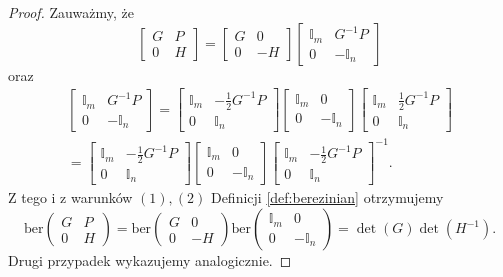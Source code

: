 \documentclass[11pt,a4paper]{report}
\theoremstyle{definition}
\newcommand{\ber}{\mathrm{ber}}
\begin{document}
\begin{proof}
	Zauważmy, że $$\begin{bmatrix}
	G & P \\
	0 & H
	\end{bmatrix} 
	= 
	\begin{bmatrix}
		G & 0  \\
		0 & -H 
	\end{bmatrix} \begin{bmatrix}
	\mathbb{I}_m & G^{-1}P \\
	0 & - \mathbb{I}_n
	\end{bmatrix}$$ oraz
	\begin{equation*}
		\begin{aligned}
			\begin{bmatrix}
			\mathbb{I}_m & G^{-1}P              \\
			0            & - \mathbb{I}_n       
			\end{bmatrix} 
			= 
			\begin{bmatrix}
			\mathbb{I}_m & -\frac{1}{2}G^{-1}P  \\
			0            & \mathbb{I}_n         
			\end{bmatrix} \begin{bmatrix}
			\mathbb{I}_m & 0                    \\
			0            & - \mathbb{I}_n       
			\end{bmatrix} \begin{bmatrix}
			\mathbb{I}_m & \frac{1}{2}G^{-1}P   \\
			0            & \mathbb{I}_n         
			\end{bmatrix} \\
			= 
			\begin{bmatrix}
			\mathbb{I}_m & -\frac{1}{2}G^{-1}P  \\
			0            & \mathbb{I}_n         
			\end{bmatrix} \begin{bmatrix}
			\mathbb{I}_m & 0                    \\
			0            & - \mathbb{I}_n       
			\end{bmatrix} \begin{bmatrix}
			\mathbb{I}_m & -\frac{1}{2} G^{-1}P \\
			0            & \mathbb{I}_n         
			\end{bmatrix}^{-1}\!.
		\end{aligned}
	\end{equation*}
	Z tego i z warunków $(1),(2)$ Definicji \ref{def:berezinian} otrzymujemy $$\ber \left( \begin{matrix}
	G & P \\
	0 & H
	\end{matrix} \right) = \ber \left( \begin{matrix}
	G & 0 \\
	0 & -H
	\end{matrix} \right) \ber \left( \begin{matrix}
	\mathbb{I}_m & 0 \\
	0 & - \mathbb{I}_n
	\end{matrix} \right) = \det(G)\det(H^{-1}).$$
	Drugi przypadek wykazujemy analogicznie.
\end{proof}
\end{document}
